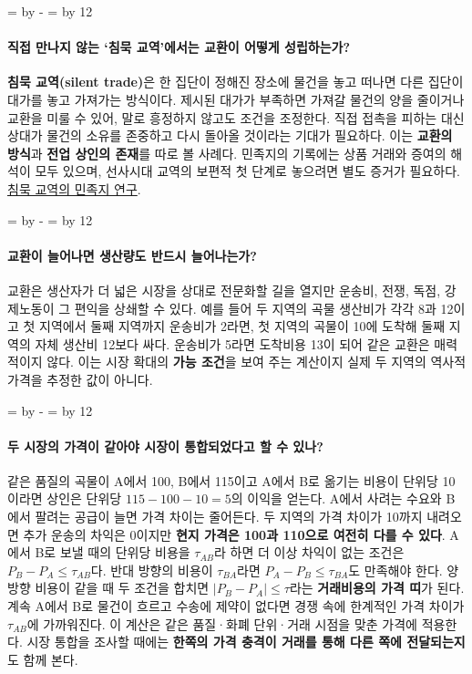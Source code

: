 \documentclass[10pt,a4paper]{article}
\newcommand{\ReserveQuestionSpace}{%
  \par\begingroup
  \dimen0=\pagegoal \advance\dimen0 by -\pagetotal
  \dimen2=\baselineskip \multiply\dimen2 by 12
  \ifdim\dimen0<\dimen2 \newpage\fi
  \endgroup}
\begin{document}
\ReserveQuestionSpace
\paragraph{직접 만나지 않는 ‘침묵 교역’에서는 교환이 어떻게 성립하는가?}
\textbf{침묵 교역(silent trade)}은 한 집단이 정해진 장소에 물건을 놓고 떠나면 다른 집단이 대가를 놓고 가져가는 방식이다. 제시된 대가가 부족하면 가져갈 물건의 양을 줄이거나 교환을 미룰 수 있어, 말로 흥정하지 않고도 조건을 조정한다. 직접 접촉을 피하는 대신 상대가 물건의 소유를 존중하고 다시 돌아올 것이라는 기대가 필요하다. 이는 \textbf{교환의 방식}과 \textbf{전업 상인의 존재}를 따로 볼 사례다. 민족지의 기록에는 상품 거래와 증여의 해석이 모두 있으며, 선사시대 교역의 보편적 첫 단계로 놓으려면 별도 증거가 필요하다. \href{https://www.journals.uchicago.edu/doi/full/10.14318/hau6.2.030}{침묵 교역의 민족지 연구}.\par

\ReserveQuestionSpace
\paragraph{교환이 늘어나면 생산량도 반드시 늘어나는가?}
교환은 생산자가 더 넓은 시장을 상대로 전문화할 길을 열지만 운송비, 전쟁, 독점, 강제노동이 그 편익을 상쇄할 수 있다. 예를 들어 두 지역의 곡물 생산비가 각각 8과 12이고 첫 지역에서 둘째 지역까지 운송비가 2라면, 첫 지역의 곡물이 10에 도착해 둘째 지역의 자체 생산비 12보다 싸다. 운송비가 5라면 도착비용 13이 되어 같은 교환은 매력적이지 않다. 이는 시장 확대의 \textbf{가능 조건}을 보여 주는 계산이지 실제 두 지역의 역사적 가격을 추정한 값이 아니다.\par

\ReserveQuestionSpace
\paragraph{두 시장의 가격이 같아야 시장이 통합되었다고 할 수 있나?}
같은 품질의 곡물이 A에서 100, B에서 115이고 A에서 B로 옮기는 비용이 단위당 10이라면 상인은 단위당 $115-100-10=5$의 이익을 얻는다. A에서 사려는 수요와 B에서 팔려는 공급이 늘면 가격 차이는 줄어든다. 두 지역의 가격 차이가 10까지 내려오면 추가 운송의 차익은 0이지만 \textbf{현지 가격은 100과 110으로 여전히 다를 수 있다}. A에서 B로 보낼 때의 단위당 비용을 $\tau_{AB}$라 하면 더 이상 차익이 없는 조건은 $P_B-P_A\leq\tau_{AB}$다. 반대 방향의 비용이 $\tau_{BA}$라면 $P_A-P_B\leq\tau_{BA}$도 만족해야 한다. 양방향 비용이 같을 때 두 조건을 합치면 $|P_B-P_A|\leq\tau$라는 \textbf{거래비용의 가격 띠}가 된다. 계속 A에서 B로 물건이 흐르고 수송에 제약이 없다면 경쟁 속에 한계적인 가격 차이가 $\tau_{AB}$에 가까워진다. 이 계산은 같은 품질·화폐 단위·거래 시점을 맞춘 가격에 적용한다. 시장 통합을 조사할 때에는 \textbf{한쪽의 가격 충격이 거래를 통해 다른 쪽에 전달되는지}도 함께 본다.\par
\end{document}
